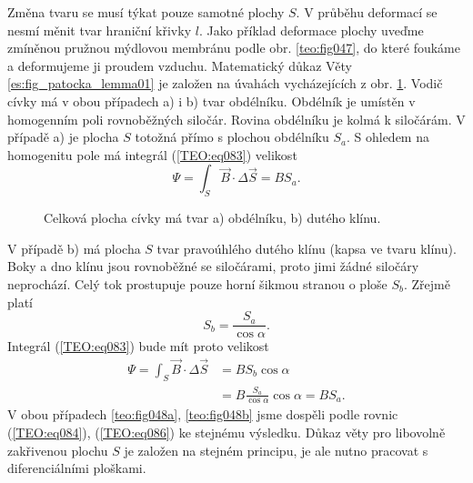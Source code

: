       Změna tvaru se musí týkat pouze samotné plochy \(S\). V průběhu deformací se nesmí měnit tvar
      hraniční křivky \(l\). Jako příklad deformace plochy uveďme zmíněnou pružnou mýdlovou membránu
      podle obr. \ref{teo:fig047}, do které foukáme a deformujeme ji proudem vzduchu. Matematický
      důkaz Věty \ref{es:fig_patocka_lemma01} je založen na úvahách vycházejících z obr.
      \ref{teo:fig048}. Vodič cívky má v obou případech a) i b) tvar obdélníku. Obdélník je umístěn
      v homogenním poli rovnoběžných siločár. Rovina obdélníku je kolmá k siločárám. V případě a) je
      plocha \(S\) totožná přímo s plochou obdélníku \(S_a\). S ohledem na homogenitu pole má
      integrál (\ref{TEO:eq083}) velikost
      \begin{equation}\label{TEO:eq084}
        \Psi = \int_S\vec{B}\cdot\Delta \vec{S} = BS_a.
      \end{equation}

      \begin{figure}[ht!]
        \centering  
        \caption{Celková plocha cívky má tvar a) obdélníku, b) dutého klínu. \cite[s.~16]{Patocka4}} 
        \label{teo:fig048}
      \end{figure}

      V případě b) má plocha \(S\) tvar pravoúhlého dutého klínu (kapsa ve tvaru klínu). Boky a dno 
      klínu jsou rovnoběžné se siločárami, proto jimi žádné siločáry neprochází. Celý tok 
      prostupuje pouze horní šikmou stranou o ploše \(S_b\). Zřejmě platí
      \begin{equation}\label{TEO:eq085}
        S_b = \frac{S_a}{\cos\alpha}.
      \end{equation}
      Integrál (\ref{TEO:eq083}) bude mít proto velikost
      \begin{align}
        \Psi  = \int_S\vec{B}\cdot\Delta \vec{S} 
             &= BS_b\cos\alpha                                       \nonumber \\ 
             &= B\frac{S_a}{\cos\alpha}\cos\alpha = BS_a.            \label{TEO:eq086}
      \end{align}
      V obou případech \ref{teo:fig048a}, \ref{teo:fig048b} jsme dospěli podle rovnic
      (\ref{TEO:eq084}), (\ref{TEO:eq086}) ke stejnému výsledku. Důkaz věty pro libovolně zakřivenou
      plochu \(S\) je založen na stejném principu, je ale nutno pracovat s diferenciálními ploškami.
      
